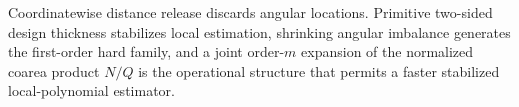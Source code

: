 Coordinatewise distance release discards angular locations.  Primitive two-sided design thickness stabilizes local estimation, shrinking angular imbalance generates the first-order hard family, and a joint order-\(m\) expansion of the normalized coarea product \(N/Q\) is the operational structure that permits a faster stabilized local-polynomial estimator.